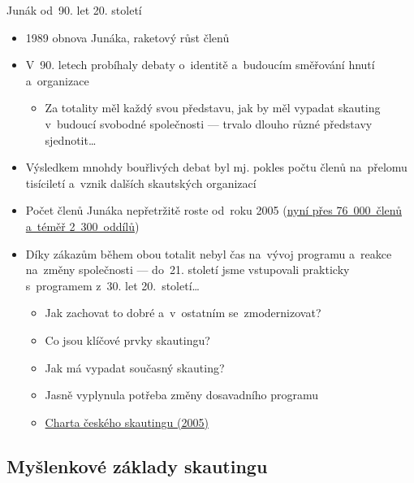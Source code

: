 \documentclass[compress, xelatex, 11pt, xcolor=dvipsnames, print, aspectratio=169,
	hyperref={
		bookmarks=true,
		unicode=true,
		colorlinks=true,
		pdftitle={Skautska vychovna metoda},
		plainpages=false,
		pdfauthor={Vojtech Zeisek},
		pdfsubject={Skautska vychovna metoda a jeji vyvoj za posledni stoleti a desetileti},
		pdfcreator={XeLaTeX},
		pdfkeywords={Junak, Pedagogika, Skaut, Skauting, Vychovna metoda},
		linkcolor=Red, %
		anchorcolor=ForestGreen, %
		citecolor=ForestGreen, %
		filecolor=ForestGreen, %
		menucolor=ForestGreen, %
		urlcolor=Sepia, %
		pdftex},
	url={hyphens, lowtilde} %
	]{beamer}
\begin{document}
\begin{frame}{Junák od~90. let 20. století}
	\begin{itemize}
		\item 1989 obnova Junáka, raketový růst členů
		\item V~90. letech probíhaly debaty o~identitě a~budoucím směřování hnutí a~organizace
		\begin{itemize}
			\item Za totality měl každý svou představu, jak by měl vypadat skauting v~budoucí svobodné společnosti --- trvalo dlouho různé představy sjednotit\ldots
		\end{itemize}
		\item Výsledkem mnohdy bouřlivých debat byl mj. pokles počtu členů na~přelomu tisíciletí a~vznik dalších skautských organizací
		\item Počet členů Junáka nepřetržitě roste od~roku 2005 (\href{https://www.skaut.cz/skauting/fakta-a-cisla/}{nyní přes 76~000~členů a~téměř 2~300~oddílů})
		\item Díky zákazům během obou totalit nebyl čas na~vývoj programu a~reakce na~změny společnosti --- do~21. století jsme vstupovali prakticky s~programem z~30. let 20.~století\ldots
		\begin{itemize}
			\item Jak zachovat to dobré a~v~ostatním se~zmodernizovat?
			\item Co jsou klíčové prvky skautingu?
			\item Jak má vypadat současný skauting?
			\item Jasně vyplynula potřeba změny dosavadního programu
			\item \href{https://drive.google.com/file/d/1oq0Nz7ZnYIq6pac_f6G1oI8awuO9rjoz/view}{Charta českého skautingu (2005)}
		\end{itemize}
	\end{itemize}
\end{frame}

\subsection{Myšlenkové základy skautingu}
\end{document}
